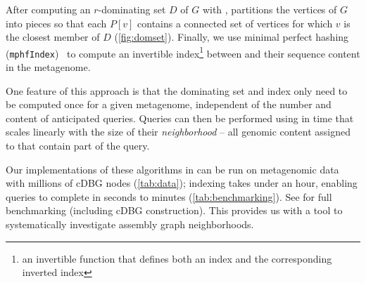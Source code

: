 After computing an $r$-dominating set $D$ of $G$ with ,
 partitions the vertices of $G$ into pieces so that
each \piece $P[v]$ contains a connected set of vertices for which $v$ is the
closest member of $D$ (\autoref{fig:domset}). Finally, we use minimal perfect
hashing (\texttt{mphfIndex})~\cite{limasset2017mphf} to compute an invertible
index\footnote{an invertible function that defines both an index and the corresponding inverted index}
between \pieces and their sequence content in the metagenome.

One feature of this approach is that the dominating set and index only need to be computed once for a given metagenome, independent of the number and content of anticipated queries.
Queries
can then be performed using  in time that
scales linearly with the size of their {\em neighborhood} --
all genomic content assigned to \pieces that contain part of the query.


Our implementations of these algorithms in \sgc can be run on
metagenomic data with millions of cDBG nodes (\autoref{tab:data});
indexing takes under an hour, enabling queries to complete in seconds
to minutes (\autoref{tab:benchmarking}). See 
for full benchmarking (including cDBG construction). This
provides us with a tool to systematically investigate assembly graph
neighborhoods.






